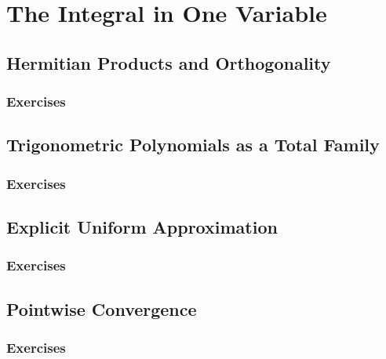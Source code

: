 \setcounter{chapter}{0}
\renewcommand{\thechapter}{12}
\chapter{The Integral in One Variable}\label{ch:12}
\setcounter{equation}{0}	        %

\section{Hermitian Products and Orthogonality}\label{sec:12.1}
\subsection*{Exercises}\label{sec:12.1_Exercises}
\section{Trigonometric Polynomials as a Total Family}\label{sec:12.2}	
\subsection*{Exercises}\label{sec:12.2_Exercises}
\section{Explicit Uniform Approximation}\label{sec:12.3}	
\subsection*{Exercises}\label{sec:12.3_Exercises}
\section{Pointwise Convergence}\label{sec:12.4}	
\subsection*{Exercises}\label{sec:12.4_Exercises}
